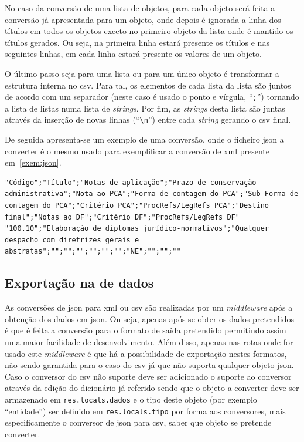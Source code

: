 No caso da conversão de uma lista de objetos, para cada objeto será feita a conversão já apresentada para um objeto, onde depois é ignorada a linha dos títulos em todos os objetos exceto no primeiro objeto da lista onde é mantido os títulos gerados. Ou seja, na primeira linha estará presente os títulos e nas seguintes linhas, em cada linha estará presente os valores de um objeto.

O último passo seja para uma lista ou para um único objeto é transformar a estrutura interna no \acrshort{csv}. Para tal, os elementos de cada lista da lista são juntos de acordo com um separador (neste caso é usado o ponto e vírgula, ``\texttt{;}'') tornando a lista de listas numa lista de \textit{strings}. Por fim, as \textit{strings} desta lista são juntas através da inserção de novas linhas (``\texttt{\textbackslash{}n}'') entre cada \textit{string} gerando o \acrshort{csv} final.

De seguida apresenta-se um exemplo de uma conversão, onde o ficheiro \acrshort{json} a converter é o mesmo usado para exemplificar a conversão de \acrshort{xml} presente em~\ref{exem:json}.

\begin{lstlisting}[caption=\acrshort{csv} resultante da conversão do \acrshort{json} presente em~\ref{exem:json}]
"Código";"Título";"Notas de aplicação";"Prazo de conservação administrativa";"Nota ao PCA";"Forma de contagem do PCA";"Sub Forma de contagem do PCA";"Critério PCA";"ProcRefs/LegRefs PCA";"Destino final";"Notas ao DF";"Critério DF";"ProcRefs/LegRefs DF"
"100.10";"Elaboração de diplomas jurídico-normativos";"Qualquer despacho com diretrizes gerais e abstratas";"";"";"";"";"";"";"NE";"";"";""
\end{lstlisting}

\subsection{Exportação na  de dados}

As conversões de \acrshort{json} para \acrshort{xml} ou \acrshort{csv} são realizadas por um \textit{middleware} após a obtenção dos dados em \acrshort{json}. Ou seja, apenas após se obter os dados pretendidos é que é feita a conversão para o formato de saída pretendido permitindo assim uma maior facilidade de desenvolvimento. Além disso, apenas nas rotas onde for usado este \textit{middleware} é que há a possibilidade de exportação nestes formatos, não sendo garantida para o caso do \acrshort{csv} já que não suporta qualquer objeto \acrshort{json}. Caso o conversor do \acrshort{csv} não suporte deve ser adicionado o suporte ao conversor através da edição do dicionário já referido sendo que o objeto a converter deve ser armazenado em \texttt{res.locals.dados} e o tipo deste objeto (por exemplo ``entidade'') ser definido em \texttt{res.locals.tipo} por forma aos conversores, mais especificamente o conversor de \acrshort{json} para \acrshort{csv}, saber que objeto se pretende converter.

